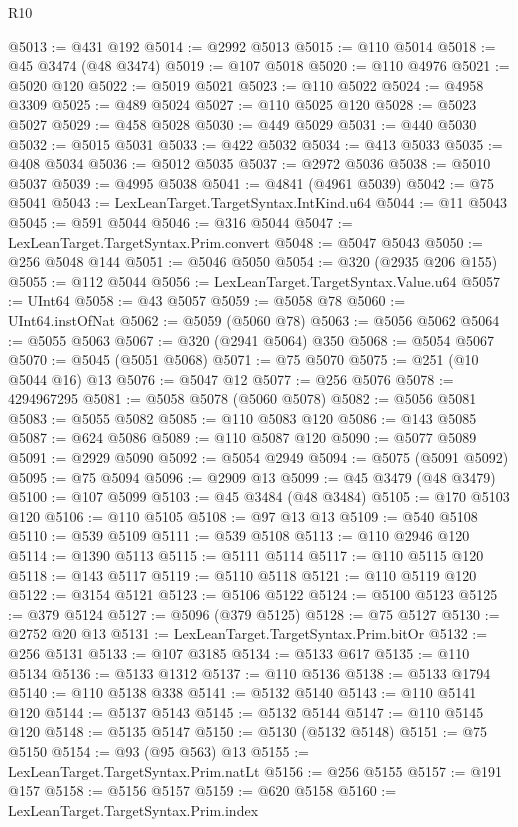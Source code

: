 \begin{lexlean}{R10}
\begin{coremodule}
@5013 := @431 @192
@5014 := @2992 @5013
@5015 := @110 @5014
@5018 := @45 @3474 (@48 @3474)
@5019 := @107 @5018
@5020 := @110 @4976
@5021 := @5020 @120
@5022 := @5019 @5021
@5023 := @110 @5022
@5024 := @4958 @3309
@5025 := @489 @5024
@5027 := @110 @5025 @120
@5028 := @5023 @5027
@5029 := @458 @5028
@5030 := @449 @5029
@5031 := @440 @5030
@5032 := @5015 @5031
@5033 := @422 @5032
@5034 := @413 @5033
@5035 := @408 @5034
@5036 := @5012 @5035
@5037 := @2972 @5036
@5038 := @5010 @5037
@5039 := @4995 @5038
@5041 := @4841 (@4961 @5039)
@5042 := @75 @5041
@5043 := LexLeanTarget.TargetSyntax.IntKind.u64
@5044 := @11 @5043
@5045 := @591 @5044
@5046 := @316 @5044
@5047 := LexLeanTarget.TargetSyntax.Prim.convert
@5048 := @5047 @5043
@5050 := @256 @5048 @144
@5051 := @5046 @5050
@5054 := @320 (@2935 @206 @155)
@5055 := @112 @5044
@5056 := LexLeanTarget.TargetSyntax.Value.u64
@5057 := UInt64
@5058 := @43 @5057
@5059 := @5058 @78
@5060 := UInt64.instOfNat
@5062 := @5059 (@5060 @78)
@5063 := @5056 @5062
@5064 := @5055 @5063
@5067 := @320 (@2941 @5064) @350
@5068 := @5054 @5067
@5070 := @5045 (@5051 @5068)
@5071 := @75 @5070
@5075 := @251 (@10 @5044 @16) @13
@5076 := @5047 @12
@5077 := @256 @5076
@5078 := 4294967295
@5081 := @5058 @5078 (@5060 @5078)
@5082 := @5056 @5081
@5083 := @5055 @5082
@5085 := @110 @5083 @120
@5086 := @143 @5085
@5087 := @624 @5086
@5089 := @110 @5087 @120
@5090 := @5077 @5089
@5091 := @2929 @5090
@5092 := @5054 @2949
@5094 := @5075 (@5091 @5092)
@5095 := @75 @5094
@5096 := @2909 @13
@5099 := @45 @3479 (@48 @3479)
@5100 := @107 @5099
@5103 := @45 @3484 (@48 @3484)
@5105 := @170 @5103 @120
@5106 := @110 @5105
@5108 := @97 @13 @13
@5109 := @540 @5108
@5110 := @539 @5109
@5111 := @539 @5108
@5113 := @110 @2946 @120
@5114 := @1390 @5113
@5115 := @5111 @5114
@5117 := @110 @5115 @120
@5118 := @143 @5117
@5119 := @5110 @5118
@5121 := @110 @5119 @120
@5122 := @3154 @5121
@5123 := @5106 @5122
@5124 := @5100 @5123
@5125 := @379 @5124
@5127 := @5096 (@379 @5125)
@5128 := @75 @5127
@5130 := @2752 @20 @13
@5131 := LexLeanTarget.TargetSyntax.Prim.bitOr
@5132 := @256 @5131
@5133 := @107 @3185
@5134 := @5133 @617
@5135 := @110 @5134
@5136 := @5133 @1312
@5137 := @110 @5136
@5138 := @5133 @1794
@5140 := @110 @5138 @338
@5141 := @5132 @5140
@5143 := @110 @5141 @120
@5144 := @5137 @5143
@5145 := @5132 @5144
@5147 := @110 @5145 @120
@5148 := @5135 @5147
@5150 := @5130 (@5132 @5148)
@5151 := @75 @5150
@5154 := @93 (@95 @563) @13
@5155 := LexLeanTarget.TargetSyntax.Prim.natLt
@5156 := @256 @5155
@5157 := @191 @157
@5158 := @5156 @5157
@5159 := @620 @5158
@5160 := LexLeanTarget.TargetSyntax.Prim.index

\end{coremodule}
\end{lexlean}
